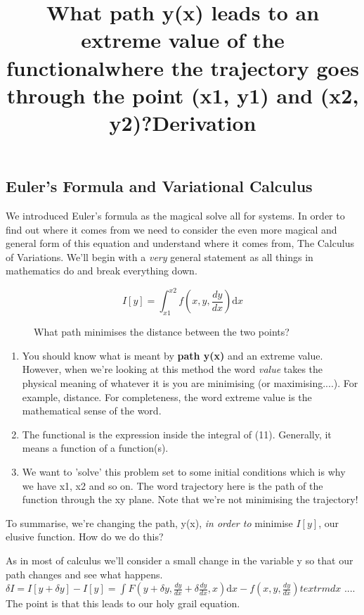 \subsection{Euler's Formula and Variational Calculus}
We introduced Euler's formula as the magical solve all for systems. In order to find out where it comes from we need to consider the even more magical and general form of this equation and understand where it comes from, The Calculus of Variations. We'll begin with a \textit{very} general statement as all things in mathematics do and break everything down.
\title{What path y(x) leads to an extreme value of the functional}
\begin{equation}
I[y] = \int_{x1}^{x2} \! f(x, y, \frac{dy}{dx}) \textrm{d}x
\end{equation}
\title{where the trajectory goes through the point (x1, y1) and (x2, y2)?}
\begin{figure}[h!]
\caption{What path minimises the distance between the two points?}
\end{figure}
\begin{enumerate}
\item You should know what is meant by \textbf{path y(x)} and an extreme value. However, when we're looking at this method the word \textit{value} takes the physical meaning of whatever it is you are minimising (or maximising....). For example, distance. For completeness, the word extreme value is the mathematical sense of the word.
\item The functional is the expression inside the integral of (11). Generally, it means a function of a function(s). 
\item We want to 'solve' this problem set to some initial conditions which is why we have x1, x2 and so on. The word trajectory here is the path of the function through the xy plane. Note that we're not minimising the trajectory!
\end{enumerate}
To summarise, we're changing the path, y(x), \textit{in order to} minimise $I[y]$, our elusive function. How do we do this?
\par
\title{\large{\textbf{Derivation}}}
As in most of calculus we'll consider a small change in the variable y so that our path changes and see what happens.
\begin{math}
\delta I = I[y +\delta y] - I[y] = \int \! F(y + \delta y, \frac{dy}{dx} + \delta \frac{dy}{dx}, x) \textrm{d}x -  f(x, y, \frac{dy}{dx}) textrm{d}x
\end{math}
....
The point is that this leads to our holy grail equation.




